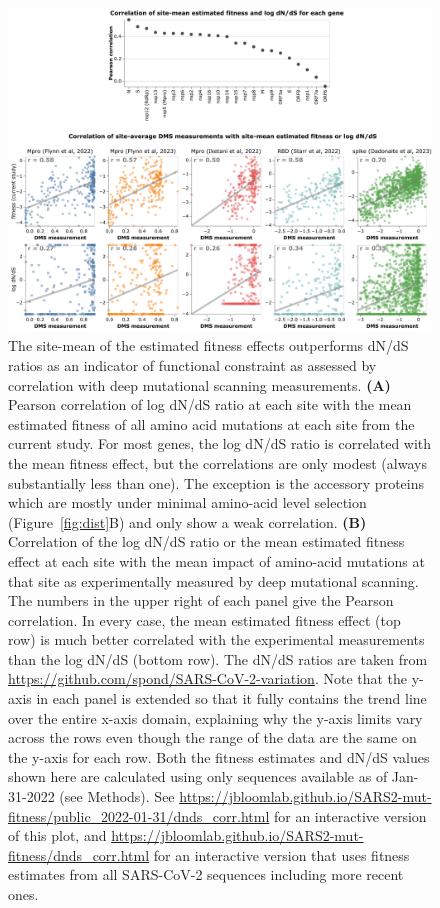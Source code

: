 \documentclass[9pt,twocolumn,twoside]{gsajnl_modified}
\begin{document}
\begin{figure}[h]
\centering
\includegraphics[width=\linewidth]{figs/dnds.png}
\caption{
The site-mean of the estimated fitness effects outperforms dN/dS ratios as an indicator of functional constraint as assessed by correlation with deep mutational scanning measurements.
{\bf (A)}
Pearson correlation of log dN/dS ratio at each site with the mean estimated fitness of all amino acid mutations at each site from the current study.
For most genes, the log dN/dS ratio is correlated with the mean fitness effect, but the correlations are only modest (always substantially less than one).
The exception is the accessory proteins which are mostly under minimal amino-acid level selection (Figure~\ref{fig:dist}B) and only show a weak correlation.
{\bf (B)}
Correlation of the log dN/dS ratio or the mean estimated fitness effect at each site with the mean impact of amino-acid mutations at that site as experimentally measured by deep mutational scanning.
The numbers in the upper right of each panel give the Pearson correlation.
In every case, the mean estimated fitness effect (top row) is much better correlated with the experimental measurements than the log dN/dS (bottom row).
The dN/dS ratios are taken from \url{https://github.com/spond/SARS-CoV-2-variation}.
Note that the y-axis in each panel is extended so that it fully contains the trend line over the entire x-axis domain, explaining why the y-axis limits vary across the rows even though the range of the data are the same on the y-axis for each row.
Both the fitness estimates and dN/dS values shown here are calculated using only sequences available as of Jan-31-2022 (see Methods).
See \url{https://jbloomlab.github.io/SARS2-mut-fitness/public_2022-01-31/dnds_corr.html} for an interactive version of this plot, and \url{https://jbloomlab.github.io/SARS2-mut-fitness/dnds_corr.html} for an interactive version that uses fitness estimates from all SARS-CoV-2 sequences including more recent ones.
\label{fig:dnds}
}
\end{figure}
\end{document}
